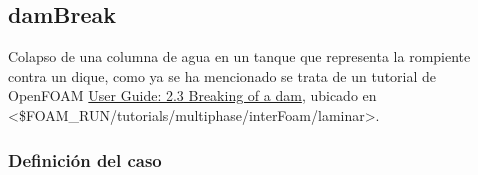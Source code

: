 \subsection{damBreak}\label{header-n531}

Colapso de una columna de agua en un tanque que representa la rompiente
contra un dique, como ya se ha mencionado se trata de un tutorial de
OpenFOAM \href{http://cfd.direct/openfoam/user-guide/dambreak/}{User
Guide: 2.3 Breaking of a dam}, ubicado en
\textless{}\$FOAM\_RUN/tutorials/multiphase/interFoam/laminar\textgreater{}.\\

\subsubsection{Definición del caso}\label{header-n536}

